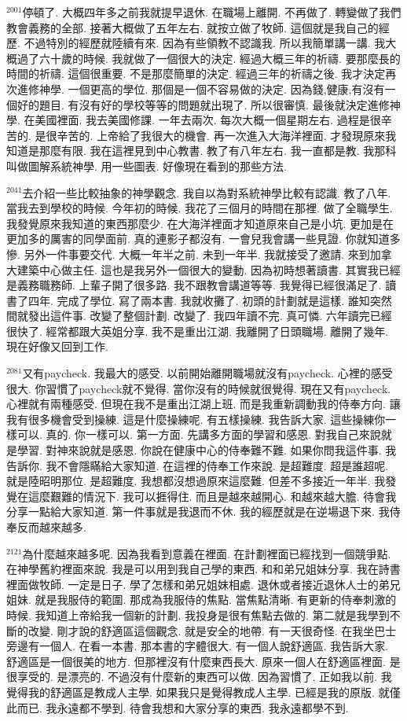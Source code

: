 \documentclass{book}
\begin{document}
$^{2001}$停頓了.
大概四年多之前我就提早退休.
在職場上離開.
不再做了.
轉變做了我們教會義務的全部.
接著大概做了五年左右.
就按立做了牧師.
這個就是我自己的經歷.
不過特別的經歷就陸續有來.
因為有些領教不認識我.
所以我簡單講一講.
我大概過了六十歲的時候.
我就做了一個很大的決定.
經過大概三年的祈禱.
要那麼長的時間的祈禱.
這個很重要.
不是那麼簡單的決定.
經過三年的祈禱之後.
我才決定再次進修神學.
一個更高的學位.
那個是一個不容易做的決定.
因為錢,健康,有沒有一個好的題目.
有沒有好的學校等等的問題就出現了.
所以很審慎.
最後就決定進修神學.
在美國裡面.
我去美國修課.
一年去兩次.
每次大概一個星期左右.
過程是很辛苦的.
是很辛苦的.
上帝給了我很大的機會.
再一次進入大海洋裡面.
才發現原來我知道是那麼有限.
我在這裡見到中心教書.
教了有八年左右.
我一直都是教.
我那科叫做圖解系統神學.
用一些圖表.
好像現在看到的那些方法.

$^{2041}$去介紹一些比較抽象的神學觀念.
我自以為對系統神學比較有認識.
教了八年.
當我去到學校的時候.
今年初的時候.
我花了三個月的時間在那裡.
做了全職學生.
我發覺原來我知道的東西那麼少.
在大海洋裡面才知道原來自己是小坑.
更加是在更加多的厲害的同學面前.
真的連影子都沒有.
一會兒我會講一些見證.
你就知道多慘.
另外一件事要交代.
大概一年半之前.
未到一年半.
我就接受了邀請.
來到加拿大建築中心做主任.
這也是我另外一個很大的變動.
因為初時想著讀書.
其實我已經是義務職務師.
上輩子開了很多路.
我不跟教會講道等等.
我覺得已經很滿足了.
讀書了四年.
完成了學位.
寫了兩本書.
我就收攤了.
初頭的計劃就是這樣.
誰知突然間就發出這件事.
改變了整個計劃.
改變了.
我四年讀不完.
真可憐.
六年讀完已經很快了.
經常都跟大英姐分享.
我不是重出江湖.
我離開了日頭職場.
離開了幾年.
現在好像又回到工作.

$^{2081}$又有paycheck.
我最大的感受.
以前開始離開職場就沒有paycheck.
心裡的感受很大.
你習慣了paycheck就不覺得.
當你沒有的時候就很覺得.
現在又有paycheck.
心裡就有兩種感受.
但現在我不是重出江湖上班.
而是我重新調動我的侍奉方向.
讓我有很多機會受到操練.
這是什麼操練呢.
有五樣操練.
我告訴大家.
這些操練你一樣可以.
真的.
你一樣可以.
第一方面.
先講多方面的學習和感恩.
對我自己來說就是學習.
對神來說就是感恩.
你說在健康中心的侍奉難不難.
如果你問我這件事.
我告訴你.
我不會隱瞞給大家知道.
在這裡的侍奉工作來說.
是超難度.
超是誰超呢.
就是陸昭明那位.
是超難度.
我想都沒想過原來這麼難.
但差不多接近一年半.
我發覺在這麼艱難的情況下.
我可以捱得住.
而且是越來越開心.
和越來越大膽.
待會我分享一點給大家知道.
第一件事就是我退而不休.
我的經歷就是在逆場退下來.
我侍奉反而越來越多.

$^{2121}$為什麼越來越多呢.
因為我看到意義在裡面.
在計劃裡面已經找到一個競爭點.
在神學舊約裡面來說.
我是可以用到我自己學的東西.
和和弟兄姐妹分享.
我在詩書裡面做牧師.
一定是日子.
學了怎樣和弟兄姐妹相處.
退休或者接近退休人士的弟兄姐妹.
就是我服侍的範圍.
那成為我服侍的焦點.
當焦點清晰.
有更新的侍奉刺激的時候.
我知道上帝給我一個新的計劃.
我投身是很有焦點去做的.
第二就是我學到不斷的改變.
剛才說的舒適區這個觀念.
就是安全的地帶.
有一天很奇怪.
在我坐巴士旁邊有一個人.
在看一本書.
那本書的字體很大.
有一個人說舒適區.
我告訴大家.
舒適區是一個很美的地方.
但那裡沒有什麼東西長大.
原來一個人在舒適區裡面.
是很享受的.
是漂亮的.
不過沒有什麼新的東西可以做.
因為習慣了.
正如我以前.
我覺得我的舒適區是教成人主學.
如果我只是覺得教成人主學.
已經是我的原版.
就僅此而已.
我永遠都不學到.
待會我想和大家分享的東西.
我永遠都學不到.
\end{document}
